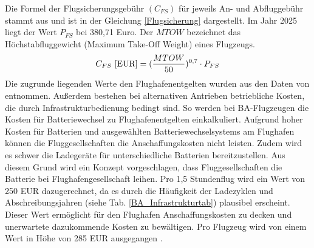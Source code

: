 Die Formel der Flugsicherungsgebühr $(C_{FS})$ für jeweils An- und Abfluggebühr stammt aus \cite{dfs_flugsicherungsgebuehren} und ist in der Gleichung \eqref{Flugsicherung}
dargestellt. Im Jahr 2025 liegt der Wert $P_{FS}$ bei 380,71 Euro. 
Der $MTOW$ bezeichnet das Höchstabfluggewicht (Maximum Take-Off Weight) eines Flugzeugs. 
\begin{equation}
	{C_{FS} ~[\text{EUR}]} = (\frac{MTOW}{50})^{0,7} \cdot P_{FS} \\
	\label{Flugsicherung}
 \end{equation}
Die zugrunde liegenden Werte den Flughafenentgelten wurden aus den Daten von \cite{fraport2025entgelte} entnommen.
Außerdem bestehen bei alternativen Antrieben betriebliche Kosten, die durch Infrastrukturbedienung bedingt sind.
So werden bei BA-Flugzeugen die Kosten für Batteriewechsel zu Flughafenentgelten einkalkuliert. Aufgrund hoher Kosten für Batterien
und ausgewählten Batteriewechselsystems am Flughafen können die Fluggesellschaften die Anschaffungskosten nicht leisten. 
Zudem wird es schwer die Ladegeräte für unterschiedliche 
Batterien bereitzustellen. Aus diesem Grund wird ein Konzept vorgeschlagen, dass
Fluggesellschaften die Batterie bei Flughafengesellschaft leihen. Pro 1,5 Stundenflug wird ein Wert von 250 EUR dazugerechnet, da es durch
die Häufigkeit der Ladezyklen und Abschreibungsjahren (siehe Tab. \ref{BA_Infrastrukturtab}) plausibel erscheint.
Dieser Wert ermöglicht für den Flughafen Anschaffungskosten zu decken und unerwartete dazukommende Kosten zu bewältigen.
Pro Flugzeug wird von einem Wert in Höhe von 285 EUR ausgegangen \cite{guo2023infrastructure}.

 
